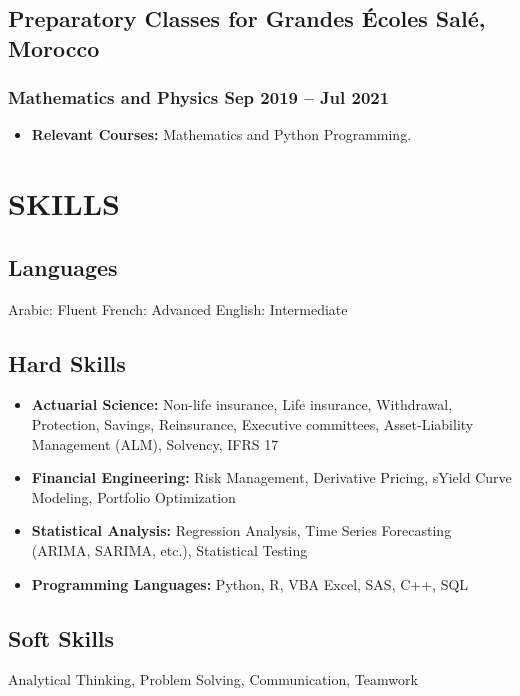 \documentclass[11pt]{amdresume}
\begin{document}
\subsection{Preparatory Classes for Grandes Écoles \hfill Salé, Morocco}
\subsubsection{Mathematics and Physics \dotfill Sep 2019 – Jul 2021}
\begin{itemize}
\item \textbf{Relevant Courses:} Mathematics and Python Programming.
\end{itemize}


\section{SKILLS}

\subsection{Languages}
Arabic: Fluent \hfill French: Advanced \hfill English: Intermediate \hspace{2cm}

\subsection{Hard Skills}
\begin{itemize}
    \item \textbf{Actuarial Science:} Non-life insurance, Life insurance, Withdrawal, Protection, Savings, Reinsurance, Executive committees, Asset-Liability Management (ALM), Solvency, IFRS 17
    \item \textbf{Financial Engineering:} Risk Management, Derivative Pricing, sYield Curve Modeling, Portfolio Optimization
    \item \textbf{Statistical Analysis:} Regression Analysis, Time Series Forecasting (ARIMA, SARIMA, etc.), Statistical Testing
    \item \textbf{Programming Languages:} Python, R, VBA Excel, SAS, C++, SQL
\end{itemize}

\subsection{Soft Skills}
Analytical Thinking, Problem Solving, Communication, Teamwork
\end{document}
